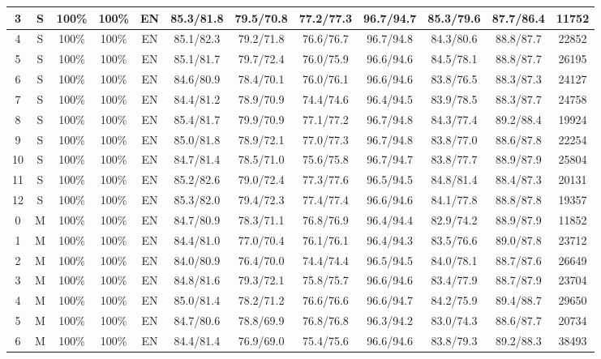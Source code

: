 \begin{table*}
{\begin{tabular}{|c|c|c|c|c||c|c|c|c|c|c||c|}
3 & S & 100\% & 100\% & EN & 85.3/81.8 & 79.5/70.8 & 77.2/77.3 & 96.7/94.7 & 85.3/79.6 & 87.7/86.4 & 11752 \\ \hline
4 & S & 100\% & 100\% & EN & 85.1/82.3 & 79.2/71.8 & 76.6/76.7 & 96.7/94.8 & 84.3/80.6 & 88.8/87.7 & 22852 \\ \hline
5 & S & 100\% & 100\% & EN & 85.1/81.7 & 79.7/72.4 & 76.0/75.9 & 96.6/94.6 & 84.5/78.1 & 88.8/87.7 & 26195 \\ \hline
6 & S & 100\% & 100\% & EN & 84.6/80.9 & 78.4/70.1 & 76.0/76.1 & 96.6/94.6 & 83.8/76.5 & 88.3/87.3 & 24127 \\ \hline
7 & S & 100\% & 100\% & EN & 84.4/81.2 & 78.9/70.9 & 74.4/74.6 & 96.4/94.5 & 83.9/78.5 & 88.3/87.7 & 24758 \\ \hline
8 & S & 100\% & 100\% & EN & 85.4/81.7 & 79.9/70.9 & 77.1/77.2 & 96.7/94.8 & 84.3/77.4 & 89.2/88.4 & 19924 \\ \hline
9 & S & 100\% & 100\% & EN & 85.0/81.8 & 78.9/72.1 & 77.0/77.3 & 96.7/94.8 & 83.8/77.0 & 88.6/87.8 & 22254 \\ \hline
10 & S & 100\% & 100\% & EN & 84.7/81.4 & 78.5/71.0 & 75.6/75.8 & 96.7/94.7 & 83.8/77.7 & 88.9/87.9 & 25804 \\ \hline
11 & S & 100\% & 100\% & EN & 85.2/82.6 & 79.0/72.4 & 77.3/77.6 & 96.5/94.5 & 84.8/81.4 & 88.4/87.3 & 20131 \\ \hline
12 & S & 100\% & 100\% & EN & 85.3/82.0 & 79.4/72.3 & 77.4/77.4 & 96.6/94.6 & 84.1/77.8 & 88.8/87.8 & 19357 \\ \hline
0 & M & 100\% & 100\% & EN & 84.7/80.9 & 78.3/71.1 & 76.8/76.9 & 96.4/94.4 & 82.9/74.2 & 88.9/87.9 & 11852 \\ \hline
1 & M & 100\% & 100\% & EN & 84.4/81.0 & 77.0/70.4 & 76.1/76.1 & 96.4/94.3 & 83.5/76.6 & 89.0/87.8 & 23712 \\ \hline
2 & M & 100\% & 100\% & EN & 84.0/80.9 & 76.4/70.0 & 74.4/74.4 & 96.5/94.5 & 84.0/78.1 & 88.7/87.6 & 26649 \\ \hline
3 & M & 100\% & 100\% & EN & 84.8/81.6 & 79.3/72.1 & 75.8/75.7 & 96.6/94.6 & 83.4/77.9 & 88.7/87.9 & 23704 \\ \hline
4 & M & 100\% & 100\% & EN & 85.0/81.4 & 78.2/71.2 & 76.6/76.6 & 96.6/94.7 & 84.2/75.9 & 89.4/88.7 & 29650 \\ \hline
5 & M & 100\% & 100\% & EN & 84.7/80.6 & 78.8/69.9 & 76.8/76.8 & 96.3/94.2 & 83.0/74.3 & 88.6/87.7 & 20734 \\ \hline
6 & M & 100\% & 100\% & EN & 84.4/81.4 & 76.9/69.0 & 75.4/75.6 & 96.6/94.6 & 83.8/79.3 & 89.2/88.3 & 38493 \\ \hline

\end{tabular}}
\end{table*}
